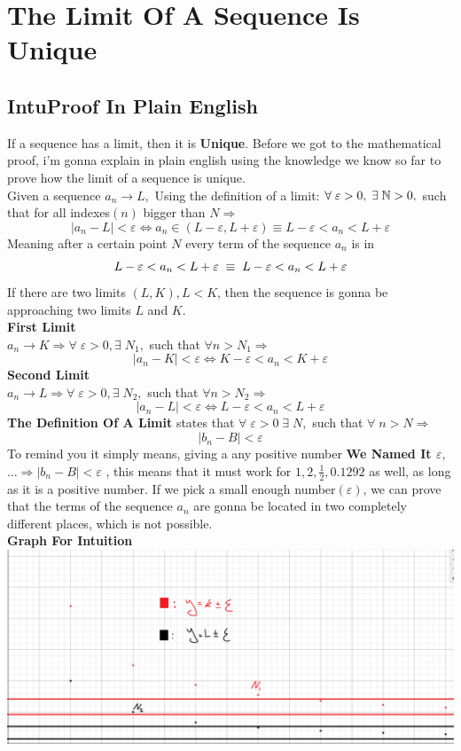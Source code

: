 \section{The Limit Of A Sequence Is Unique}
\subsection{IntuProof In Plain English}
If a sequence has a limit, then it is \textbf{Unique}. Before we got to the mathematical proof, i'm gonna explain in plain english using the knowledge we know so far to prove how the limit of a sequence is unique.\\
Given a sequence $a_n\rightarrow L,$ Using the definition of a limit: $\forall\; \varepsilon>0,\; \exists\; \mathbb{N}>0,$ such that for all indexes$(n)$ bigger than $N\Longrightarrow$
\[
    |a_n-L|<\varepsilon \iff a_n\in (L-\varepsilon,L+\varepsilon) \equiv L-\varepsilon<a_n<L+\varepsilon
\]
Meaning after a certain point $N$ every term of the sequence $a_n$ is in 
\[
    L-\varepsilon<a_n<L+\varepsilon\; \equiv\; L-\varepsilon<a_n<L+\varepsilon\\
\]
If there are two limits $(L,K), L<K$, then the sequence is gonna be approaching two limits $L$ and $K$.\\
\textbf{First Limit}\\
$a_n\rightarrow K \Longrightarrow \forall \; \varepsilon>0, \exists\; N_1,$ such that $\forall n>N_1 \Longrightarrow$
\[
    |a_n-K|<\varepsilon \iff K-\varepsilon<a_n<K+\varepsilon
\]
\textbf{Second Limit}\\
$a_n\rightarrow L \Longrightarrow \forall \; \varepsilon>0, \exists\; N_2,$ such that $\forall n>N_2 \Longrightarrow$
\[
    |a_n-L|<\varepsilon \iff L-\varepsilon<a_n<L+\varepsilon
\]
\textbf{The Definition Of A Limit} states that $\forall\; \varepsilon>0\; \exists\; N,$ such that $\forall\; n>N\Longrightarrow$
\[
    |b_n-B|<\varepsilon
\]
To remind you it simply means, giving a any positive number \textbf{We Named It $\varepsilon$},$\ldots\Longrightarrow |b_n-B|<\varepsilon$ , this means that it must work for $1,2,\frac{1}{2},0.1292$ as well, as long as it is a positive number.
If we pick a small enough number$(\varepsilon)$, we can prove that the terms of the sequence $a_n$ are gonna be located in two completely different places, which is not possible.\\
\textbf{Graph For Intuition}\\
\includegraphics[scale=0.3]{pictures/UniqueLimitGraph.png}
